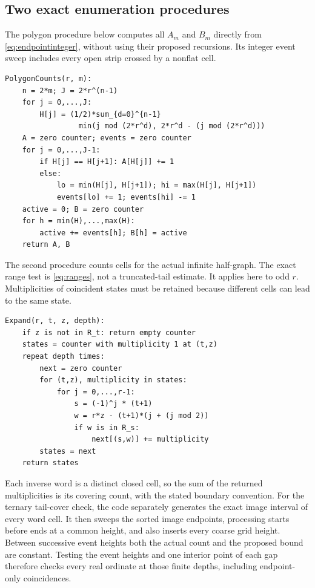 \documentclass[11pt]{article}
\theoremstyle{definition}
\theoremstyle{remark}
\begin{document}
\subsection{Two exact enumeration procedures}
The polygon procedure below computes all $A_m$ and $B_m$ directly from
\cref{eq:endpointinteger}, without using their proposed recursions. Its
integer event sweep includes every open strip crossed by a nonflat cell.
\noindent\begin{minipage}{\linewidth}
\begin{lstlisting}[caption={Direct polygon counts (function polygon\_counts).}]
PolygonCounts(r, m):
    n = 2*m; J = 2*r^(n-1)
    for j = 0,...,J:
        H[j] = (1/2)*sum_{d=0}^{n-1}
                 min(j mod (2*r^d), 2*r^d - (j mod (2*r^d)))
    A = zero counter; events = zero counter
    for j = 0,...,J-1:
        if H[j] == H[j+1]: A[H[j]] += 1
        else:
            lo = min(H[j], H[j+1]); hi = max(H[j], H[j+1])
            events[lo] += 1; events[hi] -= 1
    active = 0; B = zero counter
    for h = min(H),...,max(H):
        active += events[h]; B[h] = active
    return A, B
\end{lstlisting}
\end{minipage}
The second procedure counts cells for the actual infinite half-graph.
The exact range test is \cref{eq:ranges}, not a truncated-tail estimate.
It applies here to odd $r$. Multiplicities of coincident states must be
retained because different cells can lead to the same state.
\noindent\begin{minipage}{\linewidth}
\begin{lstlisting}[caption={Exact state expansion (functions children and advance).}]
Expand(r, t, z, depth):
    if z is not in R_t: return empty counter
    states = counter with multiplicity 1 at (t,z)
    repeat depth times:
        next = zero counter
        for (t,z), multiplicity in states:
            for j = 0,...,r-1:
                s = (-1)^j * (t+1)
                w = r*z - (t+1)*(j + (j mod 2))
                if w is in R_s:
                    next[(s,w)] += multiplicity
        states = next
    return states
\end{lstlisting}
\end{minipage}
Each inverse word is a distinct closed cell, so the sum of the returned
multiplicities is its covering count, with the stated boundary convention.
For the ternary tail-cover check, the code separately generates the exact
image interval of every word cell. It then sweeps the sorted image
endpoints, processing starts before ends at a common height, and also
inserts every coarse grid height. Between successive event heights both
the actual count and the proposed bound are constant. Testing the event
heights and one interior point of each gap therefore checks every real
ordinate at those finite depths, including endpoint-only coincidences.
\end{document}
